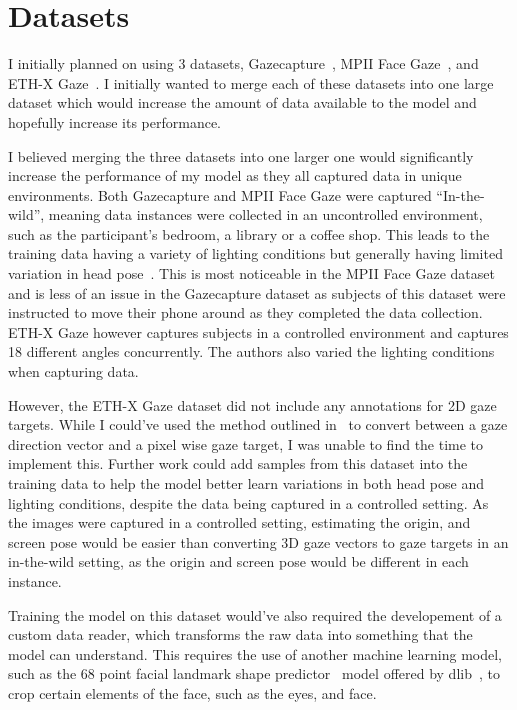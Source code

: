 \documentclass[twocolumn]{report}
\begin{document}
\section{Datasets}

I initially planned on using 3 datasets, Gazecapture~\cite{krafka2016eye}, MPII Face Gaze~\cite{zhang2019mpii}, and ETH-X Gaze~\cite{zhang2020ethxgaze}. I initially wanted to merge each of these datasets into one large dataset which would increase the amount of data available to the model and hopefully increase its performance.

I believed merging the three datasets into one larger one would significantly increase the performance of my model as they all captured data in unique environments. Both Gazecapture and MPII Face Gaze were captured ``In-the-wild'', meaning data instances were collected in an uncontrolled environment, such as the participant's bedroom, a library or a coffee shop. This leads to the training data having a variety of lighting conditions but generally having limited variation in head pose~\cite{cheng2021survey}. This is most noticeable in the MPII Face Gaze dataset and is less of an issue in the Gazecapture dataset as subjects of this dataset were instructed to move their phone around as they completed the data collection. ETH-X Gaze however captures subjects in a controlled environment and captures 18 different angles concurrently. The authors also varied the lighting conditions when capturing data.

However, the ETH-X Gaze dataset did not include any annotations for 2D gaze targets. While I could've used the method outlined in~\cite{zhang15cvpr} to convert between a gaze direction vector and a pixel wise gaze target, I was unable to find the time to implement this. Further work could add samples from this dataset into the training data to help the model better learn variations in both head pose and lighting conditions, despite the data being captured in a controlled setting. As the images were captured in a controlled setting, estimating the origin, and screen pose would be easier than converting 3D gaze vectors to gaze targets in an in-the-wild setting, as the origin and screen pose would be different in each instance. 

Training the model on this dataset would've also required the developement of a custom data reader, which transforms the raw data into something that the model can understand. This requires the use of another machine learning model, such as the 68 point facial landmark shape predictor~\cite{king2015models} model offered by dlib~\cite{king2009dlib}, to crop certain elements of the face, such as the eyes, and face. 
\end{document}
